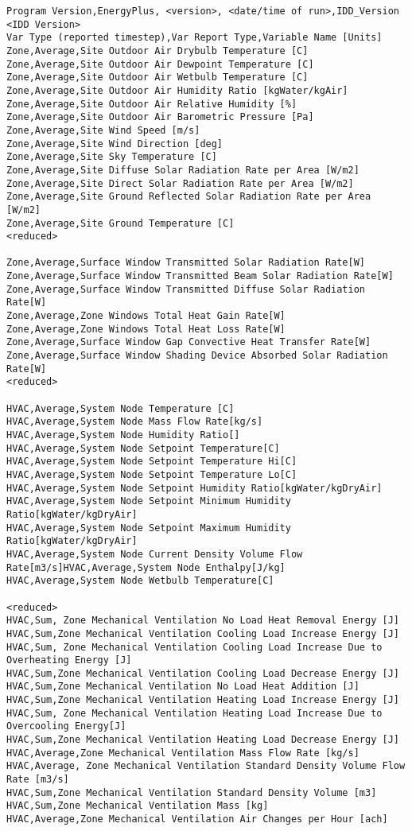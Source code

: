 \begin{lstlisting}
Program Version,EnergyPlus, <version>, <date/time of run>,IDD_Version <IDD Version>
Var Type (reported timestep),Var Report Type,Variable Name [Units]
Zone,Average,Site Outdoor Air Drybulb Temperature [C]
Zone,Average,Site Outdoor Air Dewpoint Temperature [C]
Zone,Average,Site Outdoor Air Wetbulb Temperature [C]
Zone,Average,Site Outdoor Air Humidity Ratio [kgWater/kgAir]
Zone,Average,Site Outdoor Air Relative Humidity [%]
Zone,Average,Site Outdoor Air Barometric Pressure [Pa]
Zone,Average,Site Wind Speed [m/s]
Zone,Average,Site Wind Direction [deg]
Zone,Average,Site Sky Temperature [C]
Zone,Average,Site Diffuse Solar Radiation Rate per Area [W/m2]
Zone,Average,Site Direct Solar Radiation Rate per Area [W/m2]
Zone,Average,Site Ground Reflected Solar Radiation Rate per Area [W/m2]
Zone,Average,Site Ground Temperature [C]
<reduced>

Zone,Average,Surface Window Transmitted Solar Radiation Rate[W]
Zone,Average,Surface Window Transmitted Beam Solar Radiation Rate[W]
Zone,Average,Surface Window Transmitted Diffuse Solar Radiation Rate[W]
Zone,Average,Zone Windows Total Heat Gain Rate[W]
Zone,Average,Zone Windows Total Heat Loss Rate[W]
Zone,Average,Surface Window Gap Convective Heat Transfer Rate[W]
Zone,Average,Surface Window Shading Device Absorbed Solar Radiation Rate[W]
<reduced>

HVAC,Average,System Node Temperature [C]
HVAC,Average,System Node Mass Flow Rate[kg/s]
HVAC,Average,System Node Humidity Ratio[]
HVAC,Average,System Node Setpoint Temperature[C]
HVAC,Average,System Node Setpoint Temperature Hi[C]
HVAC,Average,System Node Setpoint Temperature Lo[C]
HVAC,Average,System Node Setpoint Humidity Ratio[kgWater/kgDryAir]
HVAC,Average,System Node Setpoint Minimum Humidity Ratio[kgWater/kgDryAir]
HVAC,Average,System Node Setpoint Maximum Humidity Ratio[kgWater/kgDryAir]
HVAC,Average,System Node Current Density Volume Flow Rate[m3/s]HVAC,Average,System Node Enthalpy[J/kg]
HVAC,Average,System Node Wetbulb Temperature[C]

<reduced>
HVAC,Sum, Zone Mechanical Ventilation No Load Heat Removal Energy [J]
HVAC,Sum,Zone Mechanical Ventilation Cooling Load Increase Energy [J]
HVAC,Sum, Zone Mechanical Ventilation Cooling Load Increase Due to Overheating Energy [J]
HVAC,Sum,Zone Mechanical Ventilation Cooling Load Decrease Energy [J]
HVAC,Sum,Zone Mechanical Ventilation No Load Heat Addition [J]
HVAC,Sum,Zone Mechanical Ventilation Heating Load Increase Energy [J]
HVAC,Sum, Zone Mechanical Ventilation Heating Load Increase Due to Overcooling Energy[J]
HVAC,Sum,Zone Mechanical Ventilation Heating Load Decrease Energy [J]
HVAC,Average,Zone Mechanical Ventilation Mass Flow Rate [kg/s]
HVAC,Average, Zone Mechanical Ventilation Standard Density Volume Flow Rate [m3/s]
HVAC,Sum,Zone Mechanical Ventilation Standard Density Volume [m3]
HVAC,Sum,Zone Mechanical Ventilation Mass [kg]
HVAC,Average,Zone Mechanical Ventilation Air Changes per Hour [ach]
\end{lstlisting}

